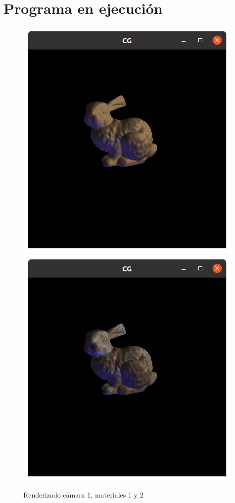 \documentclass[12pt]{article}
\begin{document}
\section{Programa en ejecución}

\begin{figure}[H]
\centering
\includegraphics[scale=0.6]{images/ej1.png}
\includegraphics[scale=0.6]{images/ej2.png}
\caption{Renderizado cámara 1, materiales 1 y 2}
\end{figure}
\end{document}
